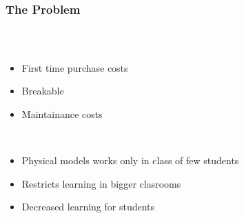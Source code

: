 \begin{frame}
  \frametitle{The Problem}
  \begin{columns}
    \begin{column}{0.7\textwidth}
      \begin{description}[]
        \item[Expensive 3D Models] \hfill \\
        \begin{itemize}
          \item First time purchase costs
          \item Breakable
          \item Maintainance costs
        \end{itemize}

        \bigskip
        \item[Restricted number of 3D models] \hfill \\
          \begin{itemize}
            \item Physical models works only in class of few students
            \item Restricts learning in bigger clasrooms
            \item Decreased learning for students
        \end{itemize}
      \end{description}
    \end{column}


\end{columns}
\end{frame}
